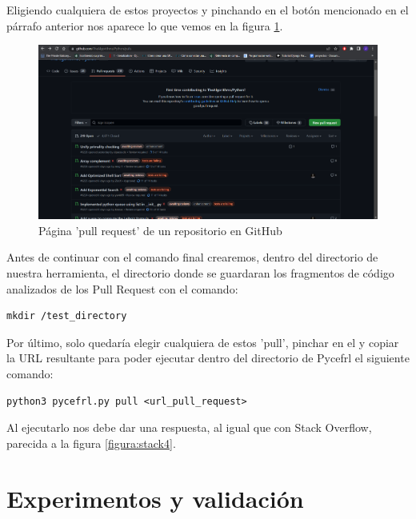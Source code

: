 \documentclass[a4paper, 12pt]{book}
\begin{document}
Eligiendo cualquiera de estos proyectos y pinchando en el botón mencionado en el párrafo anterior nos aparece lo que vemos en la figura \ref{figura:git4}.

\begin{figure}
    \includegraphics[bb=0 0 800 600, width=12cm, keepaspectratio]{img/git4}
    \caption{Página 'pull request' de un repositorio en GitHub}
    \label{figura:git4}
 \end{figure}
 
Antes de continuar con el comando final crearemos, dentro del directorio de nuestra herramienta, el directorio donde se guardaran los fragmentos de código analizados de los Pull Request con el comando:

\begin{verbatim}
mkdir /test_directory
\end{verbatim}
 
Por último, solo quedaría elegir cualquiera de estos 'pull', pinchar en el y copiar la URL resultante para poder ejecutar dentro del directorio de Pycefrl el siguiente comando:

\begin{verbatim}
python3 pycefrl.py pull <url_pull_request>
\end{verbatim}

Al ejecutarlo nos debe dar una respuesta, al igual que con Stack Overflow, parecida a la figura \ref{figura:stack4}. 


\cleardoublepage
\chapter{Experimentos y validación}
\end{document}
